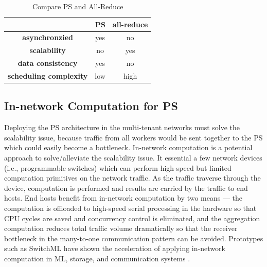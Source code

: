 \begin{table}[htb]
\caption{Compare PS and All-Reduce}

\begin{tabular}{|c|c|c|}
\hline
\multicolumn{1}{|r|}{}         & \multicolumn{1}{r|}{\textbf{PS}} & \multicolumn{1}{r|}{\textbf{all-reduce}} \\ \hline
\textbf{asynchronzied}         & yes                              & no                                       \\ \hline
\textbf{scalability}           & no                               & yes                                      \\ \hline
\textbf{data consistency}      & yes                              & no                                       \\ \hline
\textbf{scheduling complexity} & low                              & high                                     \\ \hline
\end{tabular}
\end{table}

\subsection{In-network Computation for PS}
Deploying the PS architecture in the multi-tenant networks must solve the scalability issue, because 
traffic from all workers would be sent together to the PS which could easily become a bottleneck. 
In-network computation is a potential approach to solve/alleviate the scalability issue. It essential
a few network devices (i.e., programmable switches) which can perform high-speed but limited 
computation primitives on the network traffic. As the traffic traverse through the device, computation
is performed and results are carried by the traffic to end hosts. End hosts benefit from in-network 
computation by two means --- the computation is offloaded to high-speed serial processing in the 
hardware so that CPU cycles are saved and concurrency control is eliminated, and the aggregation 
computation reduces total traffic volume dramatically so that the receiver bottleneck in the 
many-to-one communication pattern can be avoided. Prototypes such as SwitchML have
shown the acceleration of applying in-network computation in ML, storage, and communication systems .

